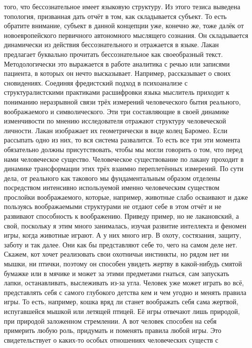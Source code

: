 того, что бессознательное имеет языковую структуру. Из этого тезиса выведена
топология, призванная дать отчёт в том, как складывается субъект. То есть
обратите внимание, субъект в данной концепции уже, конечно же, тоже далёк от
новоевропейского первичного автономного мыслящего сознания. Он складывается
динамически из действия бессознательного и отражается в языке. Лакан предлагает
буквально прочитать бессознательное как своеобразный текст. Методологически это
выражается в работе аналитика с речью или записями пациента, в которых он нечто
высказывает. Например, рассказывает о своих сновидениях. Соединяя фредистский
подход в психоанализе с структуралистскими практиками расшифровки языка
мыслитель приходит к пониманию неразрывной связи трёх измерений человеческого
бытия реального, воображаемого и символического. Эти три составляющие в своей
динамике изменчивости по мнению исследователя отражают структуру человеческой
личности. Лакан изображает их геометрически в виде колец Баромео. Если рассыпать
одно из них, то вся система развалится. То есть все три эти момента обязательно
должны присутствовать, чтобы мы могли говорить о том, что перед нами
человеческое существо. Человеческое существование по лакану проходит в динамике
трансформации этих трёх взаимно переплетённых измерений. По сути дела, от
реального как такового мы фундаментальным образом отделены посредством
интенсивно используемой именно человеческим существом прослойки воображаемого,
которые, например, животные слабо осваивают и даже пользуясь воображаемыми
структурами не отдают себе в этом отчёт и не развивают способность к
воображению. Приведу пример, но не лакановский, а свой, поскольку я этим много
занималась, изучая развитие интеллекта и феномен игры, когда животные играют. А
у них много игр. В охоту, состязания, защиту, заботу и так далее. Они как бы
представляют себе то, чего на самом деле нет. Скажем, кот хочет реализовать свои
охотничьи инстинкты, но рядом нет ни мышки, ни птички, поэтому он способен
увидеть жертву в какой-нибудь смятой бумажке или в мячике и может за этими
предметами гнаться, сам запускать лапки, останавливать, выслеживать из-за угла.
Человек уже может играть во всё, представлять себя с самого глубокого детства
кем и чем угодно и менять правила игры. То есть, например, кошка вряд ли станет
воображать себя сама жертвой, испугавшейся мышкой или летящей птицей. Её игры
отвечают лишь природой, при природой заложенном стремлении. А вот человек
способен на себя примерить любую роль, придумать и поменять правила любой игры.
Это свидетельствует о каких-то особых отношениях человеческих существ с
